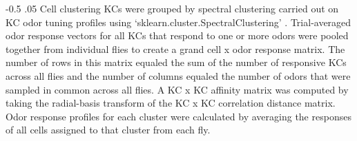 \documentclass[12pt]{caltech_thesis}
\makeatletter
\renewcommand{\cite}{{ }\autocite}
\let\Oldsubsubsection\subsubsection
\renewcommand{\subsubsection}{\FloatBarrier\Oldsubsubsection}
\renewcommand\subsubsection{%
    \@startsection{subsubsection}{4}{0mm}%
       {-0.5\baselineskip}%
       {.05\baselineskip}%
       {\normalfont\normalsize\bfseries\itshape}}
\makeatother
\begin{document}
\begin{refsection}
\subsubsection{Cell clustering}
KCs were grouped by spectral clustering carried out on KC odor tuning profiles using `sklearn.cluster.SpectralClustering'\cite{scikit-learn}.
Trial-averaged odor response vectors for all KCs that respond to one or more odors were pooled together from individual flies to create a grand cell x odor response matrix.
The number of rows in this matrix equaled the sum of the number of responsive KCs across all flies and the number of columns equaled the number of odors that were sampled in common across all flies.
A KC x KC affinity matrix was computed by taking the radial-basis transform of the KC x KC correlation distance matrix.
Odor response profiles for each cluster were calculated by averaging the responses of all cells assigned to that cluster from each fly.


\end{refsection}
\end{document}
